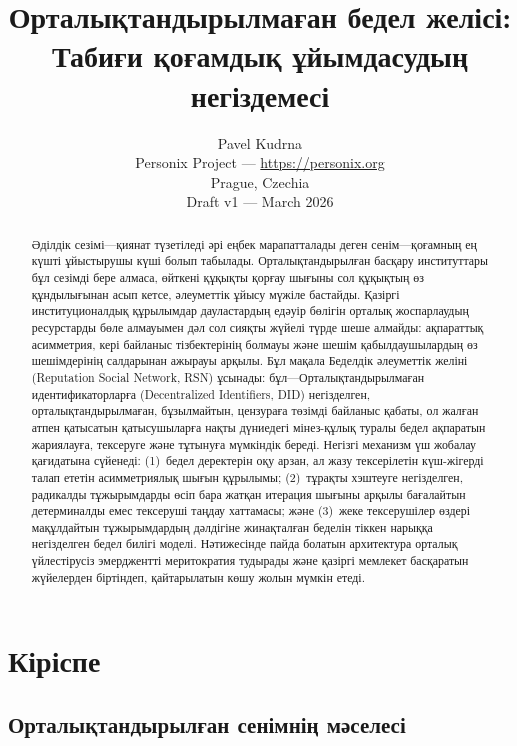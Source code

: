 \documentclass[11pt,a4paper,twocolumn]{article}
\title{\textbf{Орталықтандырылмаған бедел желісі:\\Табиғи қоғамдық ұйымдасудың негіздемесі}}
\author{Pavel Kudrna\\Personix Project --- \url{https://personix.org}\\Prague, Czechia\\Draft v1 --- March 2026}
\date{}
\begin{document}
\maketitle

\begin{abstract}
Әділдік сезімі---қиянат түзетіледі әрі еңбек марапатталады деген сенім---қоғамның ең күшті ұйыстырушы күші болып табылады. Орталықтандырылған басқару институттары бұл сезімді бере алмаса, өйткені құқықты қорғау шығыны сол құқықтың өз құндылығынан асып кетсе, әлеуметтік ұйысу мүжіле бастайды. Қазіргі институционалдық құрылымдар дауластардың едәуір бөлігін орталық жоспарлаудың ресурстарды бөле алмауымен дәл сол сияқты жүйелі түрде шеше алмайды: ақпараттық асимметрия, кері байланыс тізбектерінің болмауы және шешім қабылдаушылардың өз шешімдерінің салдарынан ажырауы арқылы. Бұл мақала Беделдік әлеуметтік желіні (Reputation Social Network, RSN) ұсынады: бұл---Орталықтандырылмаған идентификаторларға (Decentralized Identifiers, DID) негізделген, орталықтандырылмаған, бұзылмайтын, цензураға төзімді байланыс қабаты, ол жалған атпен қатысатын қатысушыларға нақты дүниедегі мінез-құлық туралы бедел ақпаратын жариялауға, тексеруге және тұтынуға мүмкіндік береді. Негізгі механизм үш жобалау қағидатына сүйенеді: (1)~бедел деректерін оқу арзан, ал жазу тексерілетін күш-жігерді талап ететін асимметриялық шығын құрылымы; (2)~тұрақты хэштеуге негізделген, радикалды тұжырымдарды өсіп бара жатқан итерация шығыны арқылы бағалайтын детерминалды емес тексеруші таңдау хаттамасы; және (3)~жеке тексерушілер өздері мақұлдайтын тұжырымдардың дәлдігіне жинақталған беделін тіккен нарыққа негізделген бедел билігі моделі. Нәтижесінде пайда болатын архитектура орталық үйлестірусіз эмерджентті меритократия тудырады және қазіргі мемлекет басқаратын жүйелерден біртіндеп, қайтарылатын көшу жолын мүмкін етеді.
\end{abstract}

\section{Кіріспе}

\subsection{Орталықтандырылған сенімнің мәселесі}
\end{document}
